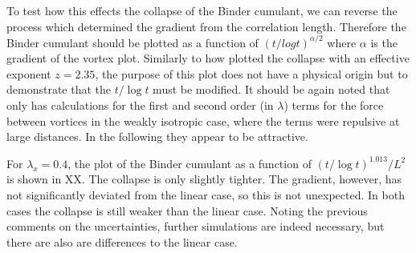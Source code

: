 To test how this effects the collapse of the Binder cumulant, we can reverse the process which determined the gradient from the correlation length. Therefore the Binder cumulant should be plotted as a function of $(t/log t)^{\alpha/2}$ where $\alpha$ is the gradient of the vortex plot. Similarly to how \cite{PhysRevLett.84.1503} plotted the collapse with an effective exponent $z=2.35$, the purpose of this plot does not have a physical origin but to demonstrate that the $t/\log t$ must be modified. It should be again noted that \cite{PhysRevB.94.104520} only has calculations for the first and second order (in $\lambda$) terms for the force between vortices in the weakly isotropic case, where the terms were repulsive at large distances. In the following they appear to be attractive. 


For $\lambda_x=0.4$, the plot of the Binder cumulant as a function of $(t/\log t)^1.013/L^2$ is shown in XX. The collapse is only slightly tighter. The gradient, however, has not significantly deviated from the linear case, so this is not unexpected. In both cases the collapse is still weaker than the linear case. Noting the previous comments on the uncertainties, further simulations are indeed necessary, but there are also are differences to the linear case. 

